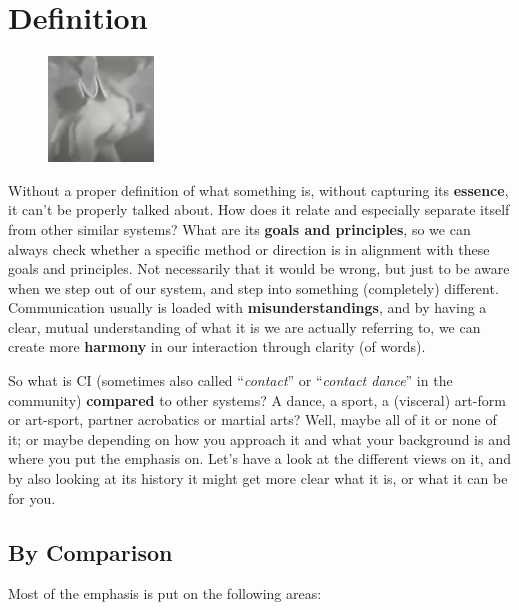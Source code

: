 \chapter{Definition}\label{ch:definition}

\begin{figure}
\centering
\includegraphics[width=0.25\textwidth]{images/definition}
\end{figure}

Without a proper definition of what something is, without capturing its \textbf{essence}, it can't be properly talked about.
How does it relate and especially separate itself from other similar systems?
What are its \textbf{goals and principles}, so we can always check whether a specific method or direction is in alignment with these goals and principles.
Not necessarily that it would be wrong, but just to be aware when we step out of our system, and step into something (completely) different.
Communication usually is loaded with \textbf{misunderstandings}, and by having a clear, mutual understanding of what it is we are actually referring to, we can create more \textbf{harmony} in our interaction through clarity (of words).

So what is CI (sometimes also called ``\textit{contact}'' or ``\textit{contact dance}'' in the community) \textbf{compared} to other systems?
A dance, a sport, a (visceral) art-form or art-sport, partner acrobatics or martial arts?
Well, maybe all of it or none of it; or maybe depending on how you approach it and what your background is and where you put the emphasis on.
Let's have a look at the different views on it, and by also looking at its history it might get more clear what it is, or what it can be for you.

\section{By Comparison}\label{sec:by-comparison}

Most of the emphasis is put on the following areas:

